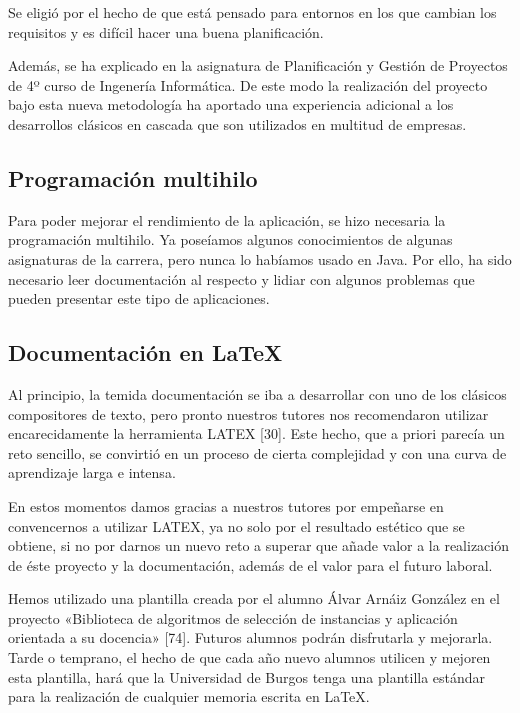 Se eligió \scrum{} por el hecho de que está pensado para entornos en los que cambian los requisitos y es difícil hacer una buena planificación.

Además, \scrum{} se ha explicado en la asignatura de Planificación y Gestión de Proyectos de 4º curso de Ingenería Informática. De este modo la realización del proyecto bajo esta nueva metodología ha aportado una experiencia adicional a los desarrollos clásicos en cascada que son utilizados en multitud de empresas.

\subsection{Programación multihilo}
Para poder mejorar el rendimiento de la aplicación, se hizo necesaria la programación multihilo. Ya poseíamos algunos conocimientos de algunas asignaturas de la carrera, pero nunca lo habíamos usado en Java. Por ello, ha sido necesario leer documentación al respecto y lidiar con algunos problemas que pueden presentar este tipo de aplicaciones.

\subsection{Documentación en \LaTeX{}}
Al principio, la temida documentación se iba a desarrollar con uno de los clásicos compositores
de texto, pero pronto nuestros tutores nos recomendaron utilizar encarecidamente la herramienta
LATEX [30]. Este hecho, que a priori parecía un reto sencillo, se convirtió en un proceso de cierta
complejidad y con una curva de aprendizaje larga e intensa.

En estos momentos damos gracias a nuestros tutores por empeñarse en convencernos a utilizar
LATEX, ya no solo por el resultado estético que se obtiene, si no por darnos un nuevo reto a superar
que añade valor a la realización de éste proyecto y la documentación, además de el valor para el
futuro laboral.

Hemos utilizado una plantilla creada por el alumno Álvar Arnáiz González en el proyecto «Biblioteca
de algoritmos de selección de instancias y aplicación orientada a su docencia» [74]. Futuros
alumnos podrán disfrutarla y mejorarla. Tarde o temprano, el hecho de que cada año nuevo
alumnos utilicen y mejoren esta plantilla, hará que la Universidad de Burgos tenga una plantilla
estándar para la realización de cualquier memoria escrita en \LaTeX{}.
